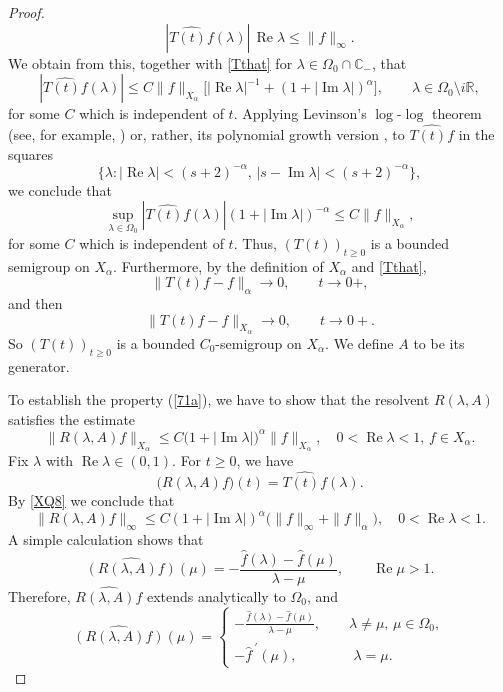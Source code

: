 \documentclass[11pt]{amsart}
\theoremstyle{definition}
\theoremstyle{remark}
\numberwithin{equation}{section}
\begin{document}
\begin{proof}
$$
|\widehat {T(t)f} (\lambda)|\, {\operatorname{Re}}\lambda\le \|f\|_{\infty}.
$$
We obtain from this, together with \eqref{Tthat} for $\lambda\in \Omega_0 \cap {{\mathbb C}}_-$, that
$$
|\widehat {T(t)f} (\lambda)|\le C\|f\|_{X_\alpha}\big[|{\operatorname{Re}} \lambda|^{-1}+(1+|{\operatorname{Im}} \lambda|)^{\alpha}\big], \qquad \lambda\in\Omega_0 \setminus i{{\mathbb R}},
$$
for some $C$ which is independent of $t$.
Applying Levinson's $\log$-$\log$ theorem (see, for example, \cite[Section VII.D7]{Koo})
or, rather, its polynomial growth version  \cite[Lemma 4.6.6]{ABHN01},
to $\widehat {T(t)f}$ in the squares
$$
\{\lambda:|{\operatorname{Re}} \lambda|<(s+2)^{-\alpha},\,
|s-{\operatorname{Im}} \lambda|<(s+2)^{-\alpha}\},
$$
we conclude that
\begin{equation}\label{XQ8}
\sup_{\lambda\in\Omega_0}
|\widehat {T(t)f} (\lambda)|(1+|{\operatorname{Im}} \lambda|)^{-\alpha}\le
C\|f\|_{X_\alpha},
\end{equation}
for some $C$ which is independent of $t$.  Thus, $(T(t))_{t \ge 0}$ is a bounded semigroup on $X_\alpha$.  Furthermore, by the definition of $X_\alpha$ and \eqref{Tthat},
$$
\| T(t)f - f \|_\alpha \to 0, \qquad t \to 0+,
$$
and then
$$
\| T(t)f - f \|_{X_\alpha} \to 0, \qquad t \to 0+.
$$
So $(T(t))_{t \ge 0}$ is a bounded $C_0$-semigroup on $X_\alpha$. We define $A$ to be its generator.

To establish the property (\ref{71a}), we have to show that the resolvent $R(\lambda,A)$ satisfies the estimate
\begin{equation}\label{polyn}
\|R(\lambda,A)f\|_{X_\alpha}\le C\big(1+|{\operatorname{Im}} \lambda|
\big)^\alpha \| f\|_{X_\alpha}, \quad 0 < {\operatorname{Re}} \lambda<1,\,f \in X_\alpha.
\end{equation}
Fix $\lambda$ with ${\operatorname{Re}}\lambda \in (0,1)$. For $t\ge0$, we have
$$
\bigl(R(\lambda,A)f \bigr)(t) = \widehat {T(t)f} (\lambda).
$$
By \eqref{XQ8} we conclude that
\begin{equation}\label{esti}
\big \|R(\lambda,A)f \big \|_{\infty}  \le C(1+|{\operatorname{Im}} \lambda|)^{\alpha} \big( \| f\|_{\infty}+ \| f \|_\alpha \big),
\quad  0 < {\operatorname{Re}} \lambda<1.
\end{equation}
A simple calculation shows that
\begin{equation*}
\widehat{(R(\lambda,A)f )}(\mu) = -\frac{\widehat f(\lambda) -\widehat f(\mu)}{\lambda - \mu}, \qquad {\operatorname{Re}}\mu>1.
\end{equation*}
Therefore, $\widehat{R(\lambda,A)f}$ extends analytically to $\Omega_0$, and
$$
\widehat{(R(\lambda,A)f )}(\mu)=\begin{cases} -\frac{\widehat
f(\lambda) -\widehat f(\mu)}{\lambda - \mu}, \qquad \lambda \neq
\mu,\, \mu \in \Omega_0,\\
-{\widehat f\,}^\prime(\mu), \qquad \qquad \lambda=\mu.
\end{cases}
$$


\end{proof}
\end{document}
